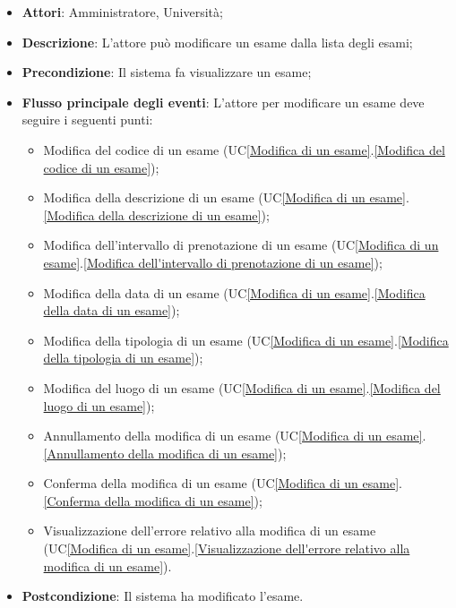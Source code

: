\begin{itemize}
	\item \textbf{Attori}: Amministratore, Università;
	\item \textbf{Descrizione}: L'attore può modificare un esame dalla lista degli esami;
	
	\item \textbf{Precondizione}: Il sistema fa visualizzare un esame;
	
	\item \textbf{Flusso principale degli eventi}: L'attore per modificare un esame deve seguire i seguenti punti:
	
	\begin{itemize}
		\item Modifica del codice di un esame (UC\ref{Modifica di un esame}.\ref{Modifica del codice di un esame});
		\item Modifica della descrizione di un esame (UC\ref{Modifica di un esame}.\ref{Modifica della descrizione di un esame});
		\item Modifica dell'intervallo di prenotazione di un esame (UC\ref{Modifica di un esame}.\ref{Modifica dell'intervallo di prenotazione di un esame});
		\item Modifica della data di un esame (UC\ref{Modifica di un esame}.\ref{Modifica della data di un esame});
		\item Modifica della tipologia di un esame (UC\ref{Modifica di un esame}.\ref{Modifica della tipologia di un esame});
		\item Modifica del luogo di un esame (UC\ref{Modifica di un esame}.\ref{Modifica del luogo di un esame});
		\item Annullamento della modifica di un esame (UC\ref{Modifica di un esame}.\ref{Annullamento della modifica di un esame});
		\item Conferma della modifica di un esame (UC\ref{Modifica di un esame}.\ref{Conferma della modifica di un esame});
		\item Visualizzazione dell'errore relativo alla modifica di un esame (UC\ref{Modifica di un esame}.\ref{Visualizzazione dell'errore relativo alla modifica di un esame}).
	\end{itemize}
	\item \textbf{Postcondizione}: Il sistema ha modificato l'esame.
	
\end{itemize}

